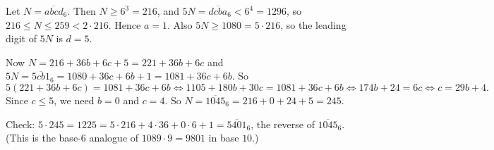 Let $N=\overline{abcd}_6$. Then $N\ge6^3=216$, and $5N=\overline{dcba}_6<6^4=1296$, so $216\le N\le259<2\cdot216$. Hence $a=1$. Also $5N\ge1080=5\cdot216$, so the leading digit of $5N$ is $d=5$.

Now $N=216+36b+6c+5=221+36b+6c$ and $5N=\overline{5cb1}_6=1080+36c+6b+1=1081+36c+6b$. So
\[5(221+36b+6c)=1081+36c+6b\iff1105+180b+30c=1081+36c+6b\iff174b+24=6c\iff c=29b+4.\]
Since $c\le5$, we need $b=0$ and $c=4$. So $N=\overline{1045}_6=216+0+24+5=\boxed{245}$.

Check: $5\cdot245=1225=5\cdot216+4\cdot36+0\cdot6+1=\overline{5401}_6$, the reverse of $\overline{1045}_6$. (This is the base-$6$ analogue of $1089\cdot9=9801$ in base $10$.)
